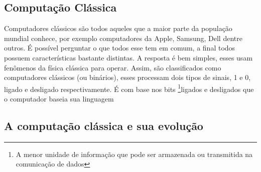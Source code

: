 \begin{samepage}
\section{Computação Clássica} 
Computadores clássicos são todos aqueles que a maior parte da população mundial conhece, por exemplo computadores da Apple, Samsung, Dell dentre outros. É possível perguntar o que todos esse tem em comum, a final todos possuem características bastante distintas. A resposta é bem simples, esses usam fenômenos da física clássica para operar. Assim, são classificados como computadores clássicos (ou binários), esses processam dois tipos de sinais, 1 e 0, ligado e desligado respectivamente. É com base nos bits \footnote{A menor unidade de informação que pode ser armazenada ou transmitida na comunicação de dados}ligados e desligados que o computador baseia sua linguagem
\subsection{A computação clássica e sua evolução}
\end{samepage}
\newpage